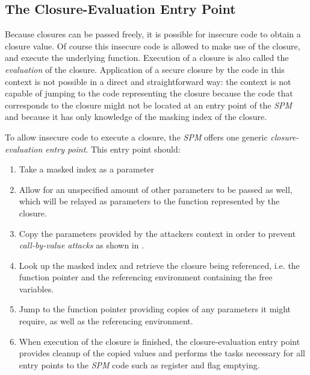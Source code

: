 \subsection{The Closure-Evaluation Entry Point}

Because closures can be passed freely, it is possible for insecure code to obtain a closure value.
Of course this insecure code is allowed to make use of the closure, and execute the underlying function.
Execution of a closure is also called the \emph{evaluation} of the closure.
Application of a secure closure by the code in this context is not possible in a direct and straightforward way: the context is not capable of jumping to the code representing the closure because the code that corresponds to the closure might not be located at an entry point of the \emph{SPM} and because it has only knowledge of the masking index of the closure.

To allow insecure code to execute a closure, the \emph{SPM} offers one generic \emph{closure-evaluation entry point}. This entry point should:

\begin{enumerate}
\item Take a masked index as a parameter
\item Allow for an unspecified amount of other parameters to be passed as well, which will be relayed as parameters to the function represented by the closure.
\item Copy the parameters provided by the attackers context in order to prevent \emph{call-by-value attacks} as shown in .
\item Look up the masked index and retrieve the closure being referenced, i.e. the function pointer and the referencing environment containing the free variables.
\item Jump to the function pointer providing copies of any parameters it might require, as well as the referencing environment.
\item When execution of the closure is finished, the closure-evaluation entry point provides cleanup of the copied values and performs the tasks necessary for all entry points to the \emph{SPM} code such as register and flag emptying.
\end{enumerate}
%
%

